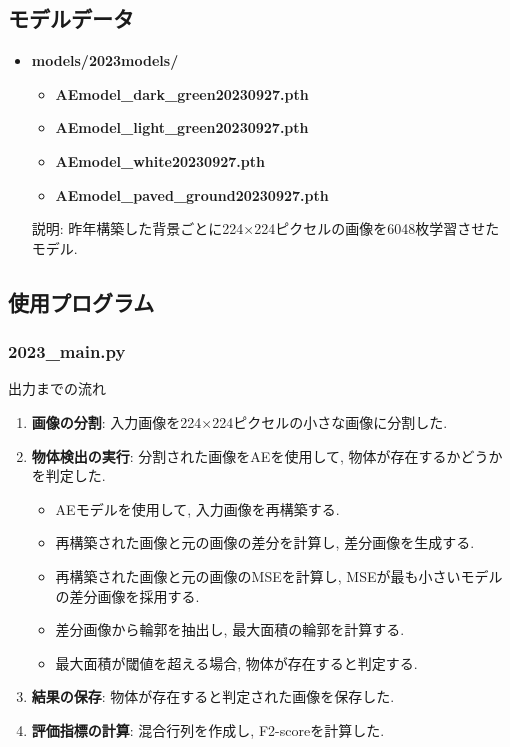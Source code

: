 \documentclass[a4paper, 12pt]{report}
\begin{document}
\subsection{モデルデータ}

\begin{itemize}
    \item \textbf{models/2023models/}
    \begin{itemize}
        \item \textbf{AEmodel\_dark\_green20230927.pth}
        \item \textbf{AEmodel\_light\_green20230927.pth}
        \item \textbf{AEmodel\_white20230927.pth}
        \item \textbf{AEmodel\_paved\_ground20230927.pth}
    \end{itemize}

    説明: 昨年構築した背景ごとに224×224ピクセルの画像を6048枚学習させたモデル. 
\end{itemize}

\subsection{使用プログラム}

\subsubsection{\textbf{2023\_main.py}}

出力までの流れ
\begin{enumerate}
    \item \textbf{画像の分割}: 入力画像を224×224ピクセルの小さな画像に分割した. 
    \item \textbf{物体検出の実行}: 分割された画像をAEを使用して, 物体が存在するかどうかを判定した. 
        \begin{itemize}
            \item AEモデルを使用して, 入力画像を再構築する. 
            \item 再構築された画像と元の画像の差分を計算し, 差分画像を生成する. 
            \item 再構築された画像と元の画像のMSEを計算し, MSEが最も小さいモデルの差分画像を採用する. 
            \item 差分画像から輪郭を抽出し, 最大面積の輪郭を計算する. 
            \item 最大面積が閾値を超える場合, 物体が存在すると判定する. 
        \end{itemize}
        \item \textbf{結果の保存}: 物体が存在すると判定された画像を保存した. 
        \item \textbf{評価指標の計算}: 混合行列を作成し, F2-scoreを計算した. 
\end{enumerate}
\end{document}
